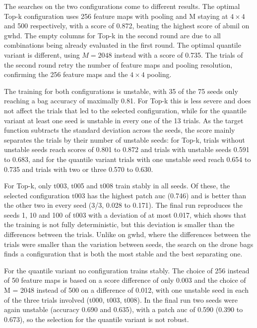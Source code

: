 \documentclass[12pt,parskip = half, DIV=classic,listof=totoc]{scrartcl}
\begin{document}
			The searches on the two configurations come to different results. The optimal Top-k configuration 
			uses 256 feature maps with pooling and M staying at $4\times4$ and 500 respectively, with a score of 
			0.872, beating the highest score of \ac{abmil} on \ac{gwhd}. The empty columns for Top-k in the second round are 
			due to all combinations being already evaluated in the first round. The optimal quantile variant is different, using
			$M=2048$ instead with a score of 0.735. The trials of the second round retry the number of feature maps and pooling resolution, 
			confirming the 256 feature maps and the $4\times4$ pooling.

			The training for both configurations is unstable, with 35 of the 75 seeds only reaching a bag accuracy of maximally 0.81.
			 For Top-k this is 
			less severe and does not affect the trials that led to the selected configuration, while for the 
			quantile variant at least one seed is unstable in every one of the 13 trials. As the target function subtracts 
			the standard deviation across the seeds, the score mainly separates the trials by their number of unstable 
			seeds: for Top-k, trials without unstable seeds reach scores of 0.801 to 0.872 and trials with unstable seeds 0.591 
			to 0.683, and for the quantile variant trials with one unstable seed reach 0.654 to 0.735 and trials with 
			two or three 0.570 to 0.630.

			For Top-k, only t003, t005 and t008 train stably in all seeds. Of these, the selected configuration 
			t003 has the highest patch \ac{auc} (0.746) and is better than the other two in every seed (3/3, 0.028 to 0.171). 
			The final run reproduces the seeds 1, 10 and 100 of t003 with a deviation of at most 0.017, 
			which shows that the training is not fully deterministic, but this deviation is smaller than 
			the differences between the trials. Unlike on \ac{gwhd}, where the differences between the trials 
			were smaller than the variation between seeds, the search on the drone bags finds a configuration 
			that is both the most stable and the best separating one.

			For the quantile variant no configuration trains stably. The choice of 256 instead of 50 feature maps is 
			based on a score difference of only 0.003 and the choice of M = 2048 instead of 500 on a difference of 
			0.012, with one unstable seed in each of the three trials involved (t000, t003, t008). In the final run 
			two seeds were again unstable (accuracy 0.690 and 0.635), with a patch \ac{auc} of 0.590 (0.390 to 0.673), so the 
			selection for the quantile variant is not robust.
\end{document}
